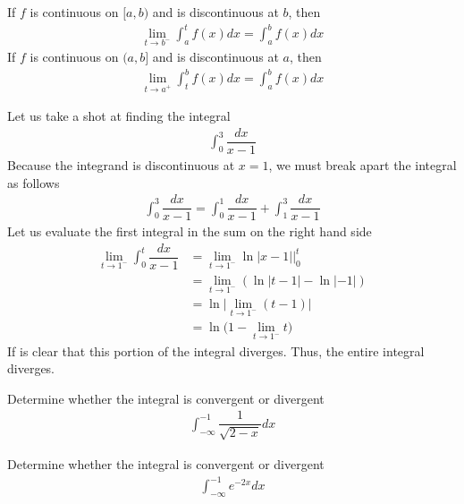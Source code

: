 \begin{definition}
If $f$ is continuous on $[a, b)$ and is discontinuous at $b$, then 
\begin{align*}
    \lim_{t \longrightarrow b^{-}} \int_{a}^{t} f(x) dx = \int_{a}^{b} f(x) dx
\end{align*}
If $f$ is continuous on $(a, b]$ and is discontinuous at $a$, then 
\begin{align*}
    \lim_{t \longrightarrow a^{+}} \int_{t}^{b} f(x) dx = \int_{a}^{b} f(x) dx
\end{align*}
\end{definition}

\begin{example}
Let us take a shot at finding the integral
\begin{align*}
    \int_{0}^{3} \dfrac{dx}{x - 1}
\end{align*}
Because the integrand is discontinuous at $x = 1$, we must break apart the integral as follows
\begin{align*}
    \int_{0}^{3} \dfrac{dx}{x - 1} = \int_{0}^{1} \dfrac{dx}{x-1} + \int_{1}^{3} \dfrac{dx}{x-1} 
\end{align*}
Let us evaluate the first integral in the sum on the right hand side
\begin{align*}
    \lim_{t \longrightarrow 1^{-}} \int_{0}^{t} \dfrac{dx}{x-1} &= \lim_{t \longrightarrow 1^{-}} \ln \lvert x - 1 \rvert \Big|_{0}^{t}\\[2ex]
    &= \lim_{t \longrightarrow 1^{-}} (\ln \lvert t - 1 \rvert - \ln \lvert -1 \rvert)\\[2ex]
    &= \ln \Big\lvert \lim_{t \longrightarrow 1^{-}} (t - 1) \Big\rvert\\[2ex]
    &= \ln \Big(1 - \lim_{t \longrightarrow 1^{-}} t \Big)
\end{align*}
If is clear that this portion of the integral diverges. Thus, the entire integral diverges. 
\end{example}

\begin{exercise}
Determine whether the integral is convergent or divergent
\begin{align*}
    \int_{-\infty}^{-1} \dfrac{1}{\sqrt{2-x}} dx
\end{align*}
\end{exercise}

\begin{exercise}
Determine whether the integral is convergent or divergent
\begin{align*}
    \int_{-\infty}^{-1} e^{-2x} dx
\end{align*}
\end{exercise}

